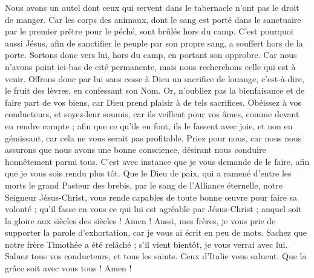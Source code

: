 \begin{multicols}{2}
Nous avons un autel dont ceux qui servent dans le tabernacle n'ont pas le droit de manger.
Car les corps des animaux, dont le sang est porté dans le sanctuaire par le premier prêtre pour le péché, sont brûlés hors du camp.
C'est pourquoi aussi Jésus, afin de sanctifier le peuple par son propre sang, a souffert hors de la porte.
Sortons donc vers lui, hors du camp, en portant son opprobre.
Car nous n'avons point ici-bas de cité permanente, mais nous recherchons celle qui est à venir.
Offrons donc par lui sans cesse à Dieu un sacrifice de louange, c'est-à-dire, le fruit des lèvres, en confessant son Nom.
Or, n'oubliez pas la bienfaisance et de faire part de vos biens, car Dieu prend plaisir à de tels sacrifices.
Obéissez à vos conducteurs, et soyez-leur soumis, car ils veillent pour vos âmes, comme devant en rendre compte ; afin que ce qu'ils en font, ils le fassent avec joie, et non en gémissant, car cela ne vous serait pas profitable.
 Priez pour nous, car nous nous assurons que nous avons une bonne conscience, désirant nous conduire honnêtement parmi tous.
C'est avec instance que je vous demande de le faire, afin que je vous sois rendu plus tôt.
Que le Dieu de paix, qui a ramené d'entre les morts le grand Pasteur des brebis, par le sang de l'Alliance éternelle, notre Seigneur Jésus-Christ,
vous rende capables de toute bonne œuvre pour faire sa volonté ; qu'il fasse en vous ce qui lui est agréable par Jésus-Christ ; auquel soit la gloire aux siècles des siècles ! Amen !
Aussi, mes frères, je vous prie de supporter la parole d'exhortation, car je vous ai écrit en peu de mots.
Sachez que notre frère Timothée a été relâché ; s'il vient bientôt, je vous verrai avec lui.
Saluez tous vos conducteurs, et tous les saints. Ceux d'Italie vous saluent.
Que la grâce soit avec vous tous ! Amen !
\PPE{}
\end{multicols}
